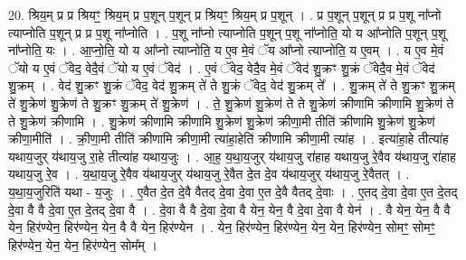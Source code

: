 \documentclass[17pt]{extarticle}
\begin{document}
20. श्रिय॒म् प्र प्र श्रियꣳ॒॒ श्रिय॒म् प्र प॒शून् प॒शून् प्र श्रियꣳ॒॒ श्रिय॒म् प्र प॒शून् । . प्र प॒शून् प॒शून् प्र प्र प॒शू ना᳚प्नो त्याप्नोति प॒शून् प्र प्र प॒शू ना᳚प्नोति । . प॒शू ना᳚प्नो त्याप्नोति प॒शून् प॒शू ना᳚प्नोति॒ यो य आ᳚प्नोति प॒शून् प॒शू ना᳚प्नोति॒ यः । . आ॒प्नो॒ति॒ यो य आ᳚प्नो त्याप्नोति॒ य ए॒व मे॒वं ॅय आ᳚प्नो त्याप्नोति॒ य ए॒वम् । . य ए॒व मे॒वं ॅयो य ए॒वं ॅवेद॒ वेदै॒वं ॅयो य ए॒वं ॅवेद॑ । . ए॒वं ॅवेद॒ वेदै॒व मे॒वं ॅवेद॑ शु॒क्रꣳ शु॒क्रं ॅवेदै॒व मे॒वं ॅवेद॑ शु॒क्रम् । . वेद॑ शु॒क्रꣳ शु॒क्रं ॅवेद॒ वेद॑ शु॒क्रम् ते॑ ते शु॒क्रं ॅवेद॒ वेद॑ शु॒क्रम् ते᳚ । . शु॒क्रम् ते॑ ते शु॒क्रꣳ शु॒क्रम् ते॑ शु॒क्रेण॑ शु॒क्रेण॑ ते शु॒क्रꣳ शु॒क्रम् ते॑ शु॒क्रेण॑ । . ते॒ शु॒क्रेण॑ शु॒क्रेण॑ ते ते शु॒क्रेण॑ क्रीणामि क्रीणामि शु॒क्रेण॑ ते ते शु॒क्रेण॑ क्रीणामि । . शु॒क्रेण॑ क्रीणामि क्रीणामि शु॒क्रेण॑ शु॒क्रेण॑ क्रीणा॒मी तीति॑ क्रीणामि शु॒क्रेण॑ शु॒क्रेण॑ क्रीणा॒मीति॑ । . क्री॒णा॒मी तीति॑ क्रीणामि क्रीणा॒मी त्या॑हा॒हेति॑ क्रीणामि क्रीणा॒मी त्या॑ह । . इत्या॑हा॒हे तीत्या॑ह यथाय॒जुर् य॑थाय॒जु रा॒हे तीत्या॑ह यथाय॒जुः । . आ॒ह॒ य॒था॒य॒जुर् य॑थाय॒जु रा॑हाह यथाय॒जु रे॒वैव य॑थाय॒जु रा॑हाह यथाय॒जु रे॒व । . य॒था॒य॒जु रे॒वैव य॑थाय॒जुर् य॑थाय॒जु रे॒वैत दे॒त दे॒व य॑थाय॒जुर् य॑थाय॒जु रे॒वैतत् । . य॒था॒य॒जुरिति॑ यथा - य॒जुः । . ए॒वैत दे॒त दे॒वै वैतद् दे॒वा दे॒वा ए॒त दे॒वै वैतद् दे॒वाः । . ए॒तद् दे॒वा दे॒वा ए॒त दे॒तद् दे॒वा वै वै दे॒वा ए॒त दे॒तद् दे॒वा वै । . दे॒वा वै वै दे॒वा दे॒वा वै येन॒ येन॒ वै दे॒वा दे॒वा वै येन॑ । . वै येन॒ येन॒ वै वै येन॒ हिर॑ण्येन॒ हिर॑ण्येन॒ येन॒ वै वै येन॒ हिर॑ण्येन । . येन॒ हिर॑ण्येन॒ हिर॑ण्येन॒ येन॒ येन॒ हिर॑ण्येन॒ सोमꣳ॒॒ सोमꣳ॒॒ हिर॑ण्येन॒ येन॒ येन॒ हिर॑ण्येन॒ सोम᳚म् । \newline
\end{document}
